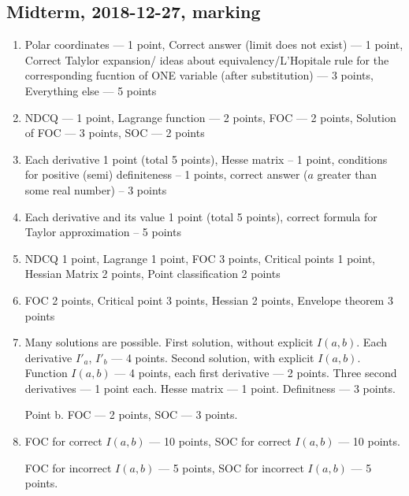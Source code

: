 \subsection{Midterm, 2018-12-27, marking}

\begin{enumerate}
\item Polar coordinates — 1 point, Correct answer (limit does not exist) — 1 point, Correct Talylor expansion/ ideas about equivalency/L'Hopitale rule for the corresponding fucntion of ONE variable (after substitution) — 3 points, Everything else — 5 points
\item
NDCQ — 1 point, Lagrange function — 2 points, FOC — 2 points, Solution of FOC — 3 points, SOC — 2 points

  \item Each derivative 1 point (total 5 points), Hesse matrix – 1
  point, conditions for positive (semi) definiteness – 1 points, correct answer ($a$ greater than some real number) – 3 points
 \item  Each derivative and its value 1 point (total 5 points), correct formula for Taylor approximation – 5
points
\item NDCQ 1 point, Lagrange 1 point, FOC 3 points, Critical points 1 point, Hessian Matrix 2 points, Point classification 2 points
\item FOC 2 points, Critical point 3 points, Hessian 2 points, Envelope theorem 3 points
  \item Many solutions are possible. First solution, without explicit $I(a,b)$. Each derivative $I'_a$, $I'_b$ — 4 points. Second solution, with explicit $I(a,b)$. Function $I(a,b)$ — 4 points, each first derivative — 2 points.
  Three second derivatives — 1 point each. Hesse matrix — 1 point. Definitness — 3 points.

  Point b. FOC — 2 points, SOC — 3 points.
  \item FOC for correct $I(a,b)$ — 10 points, SOC for correct $I(a,b)$ — 10 points.

FOC for incorrect $I(a,b)$ — 5 points, SOC for incorrect $I(a,b)$ — 5 points.

\end{enumerate}
